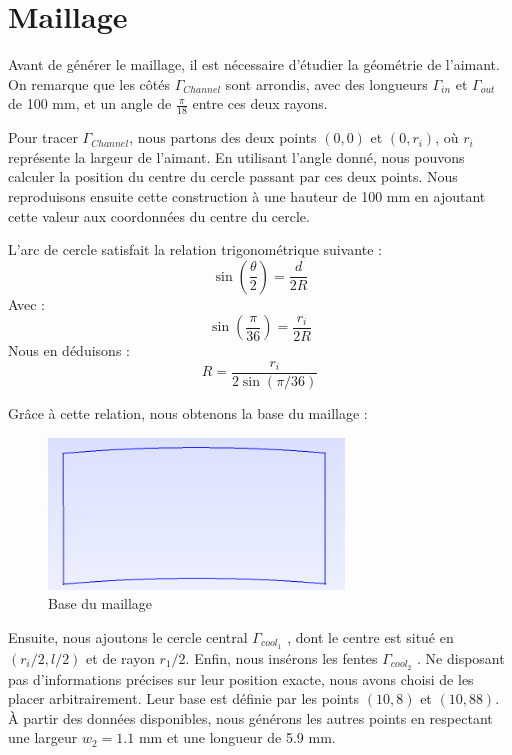 \documentclass{article}
\begin{document}
\section{Maillage}

Avant de générer le maillage, il est nécessaire d'étudier la géométrie de l'aimant. On remarque que les côtés  \textit{\( \Gamma_{Channel} \)} sont arrondis, avec des longueurs \textit{\( \Gamma_{in}\)} et \textit{\( \Gamma_{out}\)} de 100 mm, et un angle de \( \frac{\pi}{18} \) entre ces deux rayons.

Pour tracer \textit{\( \Gamma_{Channel} \)}, nous partons des deux points \((0,0)\) et \((0, r_i)\), où \( r_i \) représente la largeur de l'aimant. En utilisant l'angle donné, nous pouvons calculer la position du centre du cercle passant par ces deux points. Nous reproduisons ensuite cette construction à une hauteur de 100 mm en ajoutant cette valeur aux coordonnées du centre du cercle.

L’arc de cercle satisfait la relation trigonométrique suivante :
\begin{equation}
\sin\left(\frac{\theta}{2}\right) = \frac{d}{2R}
\end{equation}
Avec :
\begin{equation}
\sin\left(\frac{\pi}{36}\right) = \frac{r_i}{2R}
\end{equation}
Nous en déduisons :
\begin{equation}
R = \frac{r_i}{2 \sin(\pi/36)}
\end{equation}

Grâce à cette relation, nous obtenons la base du maillage :

\begin{figure}[H]
    \centering
    \includegraphics[width=0.7\textwidth]{images/gmsh_1.png}
    \caption{Base du maillage}
\end{figure}

Ensuite, nous ajoutons le cercle central \textit{\( \Gamma_{cool_1} \) }, dont le centre est situé en \( (r_i/2, l/2) \) et de rayon \( r_1/2 \). Enfin, nous insérons les fentes \textit{\( \Gamma_{cool_2} \) }. Ne disposant pas d’informations précises sur leur position exacte, nous avons choisi de les placer arbitrairement. Leur base est définie par les points \((10,8)\) et \((10,88)\). À partir des données disponibles, nous générons les autres points en respectant une largeur \( w_2 = 1.1 \) mm et une longueur de 5.9 mm. 
\end{document}
